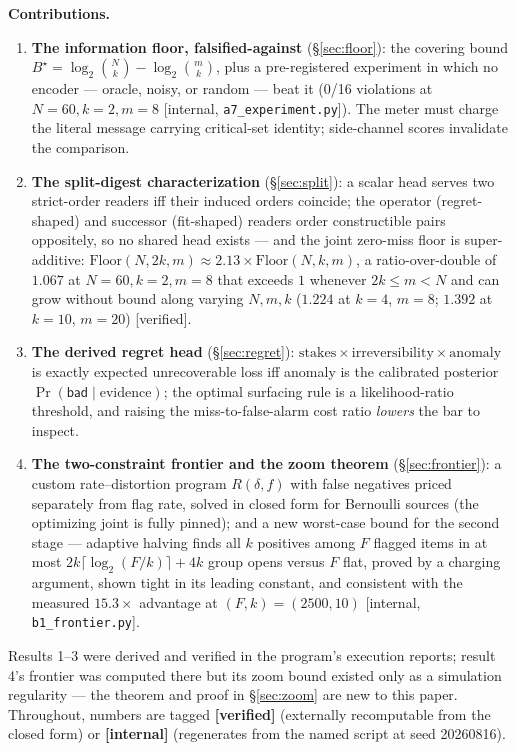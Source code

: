 \documentclass[11pt,a4paper]{article}
\begin{document}
\textbf{Contributions.}
\begin{enumerate}[leftmargin=1.6em]
\item \textbf{The information floor, falsified-against} (\S\ref{sec:floor}): the covering bound $B^\star=\log_2\binom{N}{k}-\log_2\binom{m}{k}$, plus a pre-registered experiment in which no encoder --- oracle, noisy, or random --- beat it (0/16 violations at $N{=}60,k{=}2,m{=}8$ [internal, \texttt{a7\_experiment.py}]). The meter must charge the literal message carrying critical-set identity; side-channel scores invalidate the comparison.
\item \textbf{The split-digest characterization} (\S\ref{sec:split}): a scalar head serves two strict-order readers iff their induced orders coincide; the operator (regret-shaped) and successor (fit-shaped) readers order constructible pairs oppositely, so no shared head exists --- and the joint zero-miss floor is super-additive: $\mathrm{Floor}(N,2k,m)\approx 2.13\times\mathrm{Floor}(N,k,m)$, a ratio-over-double of $1.067$ at $N{=}60,k{=}2,m{=}8$ that exceeds $1$ whenever $2k\le m<N$ and can grow without bound along varying $N,m,k$ ($1.224$ at $k{=}4$, $m{=}8$; $1.392$ at $k{=}10$, $m{=}20$) [verified].
\item \textbf{The derived regret head} (\S\ref{sec:regret}): $\mathrm{stakes}\times\mathrm{irreversibility}\times\mathrm{anomaly}$ is exactly expected unrecoverable loss iff anomaly is the calibrated posterior $\Pr(\mathsf{bad}\mid\text{evidence})$; the optimal surfacing rule is a likelihood-ratio threshold, and raising the miss-to-false-alarm cost ratio \emph{lowers} the bar to inspect.
\item \textbf{The two-constraint frontier and the zoom theorem} (\S\ref{sec:frontier}): a custom rate--distortion program $R(\delta,f)$ with false negatives priced separately from flag rate, solved in closed form for Bernoulli sources (the optimizing joint is fully pinned); and a new worst-case bound for the second stage --- adaptive halving finds all $k$ positives among $F$ flagged items in at most $2k\lceil\log_2(F/k)\rceil+4k$ group opens versus $F$ flat, proved by a charging argument, shown tight in its leading constant, and consistent with the measured $15.3\times$ advantage at $(F,k)=(2500,10)$ [internal, \texttt{b1\_frontier.py}].
\end{enumerate}
Results 1--3 were derived and verified in the program's execution reports; result 4's frontier was computed there but its zoom bound existed only as a simulation regularity --- the theorem and proof in \S\ref{sec:zoom} are new to this paper. Throughout, numbers are tagged \textbf{[verified]} (externally recomputable from the closed form) or \textbf{[internal]} (regenerates from the named script at seed 20260816).
\end{document}
